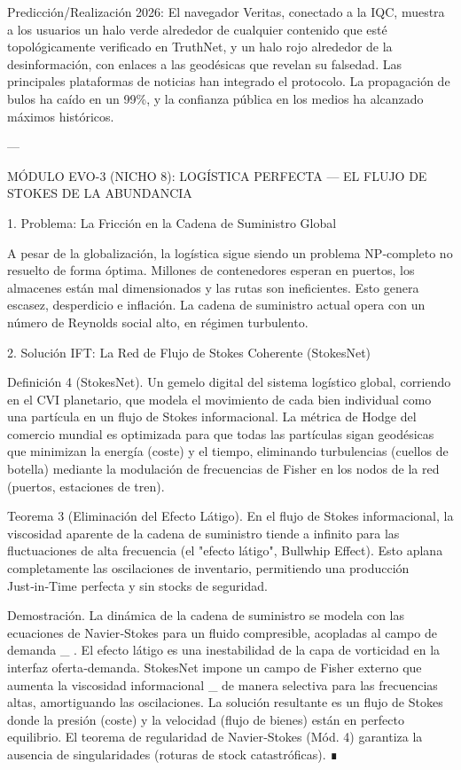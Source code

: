 \documentclass[12pt,twoside]{book}
\begin{document}
Predicción/Realización 2026: El navegador Veritas, conectado a la IQC, muestra a los usuarios un halo verde alrededor de cualquier contenido que esté topológicamente verificado en TruthNet, y un halo rojo alrededor de la desinformación, con enlaces a las geodésicas que revelan su falsedad. Las principales plataformas de noticias han integrado el protocolo. La propagación de bulos ha caído en un 99\%, y la confianza pública en los medios ha alcanzado máximos históricos.

---

MÓDULO EVO-3 (NICHO 8): LOGÍSTICA PERFECTA — EL FLUJO DE STOKES DE LA ABUNDANCIA

1. Problema: La Fricción en la Cadena de Suministro Global

A pesar de la globalización, la logística sigue siendo un problema NP‑completo no resuelto de forma óptima. Millones de contenedores esperan en puertos, los almacenes están mal dimensionados y las rutas son ineficientes. Esto genera escasez, desperdicio e inflación. La cadena de suministro actual opera con un número de Reynolds social alto, en régimen turbulento.

2. Solución IFT: La Red de Flujo de Stokes Coherente (StokesNet)

Definición 4 (StokesNet). Un gemelo digital del sistema logístico global, corriendo en el CVI planetario, que modela el movimiento de cada bien individual como una partícula en un flujo de Stokes informacional. La métrica de Hodge del comercio mundial es optimizada para que todas las partículas sigan geodésicas que minimizan la energía (coste) y el tiempo, eliminando turbulencias (cuellos de botella) mediante la modulación de frecuencias de Fisher en los nodos de la red (puertos, estaciones de tren).

Teorema 3 (Eliminación del Efecto Látigo). En el flujo de Stokes informacional, la viscosidad aparente de la cadena de suministro tiende a infinito para las fluctuaciones de alta frecuencia (el "efecto látigo", Bullwhip Effect). Esto aplana completamente las oscilaciones de inventario, permitiendo una producción Just‑in‑Time perfecta y sin stocks de seguridad.

Demostración. La dinámica de la cadena de suministro se modela con las ecuaciones de Navier‑Stokes para un fluido compresible, acopladas al campo de demanda  \rho_{} . El efecto látigo es una inestabilidad de la capa de vorticidad en la interfaz oferta‑demanda. StokesNet impone un campo de Fisher externo que aumenta la viscosidad informacional  \nu_{}  de manera selectiva para las frecuencias altas, amortiguando las oscilaciones. La solución resultante es un flujo de Stokes donde la presión (coste) y la velocidad (flujo de bienes) están en perfecto equilibrio. El teorema de regularidad de Navier‑Stokes (Mód. 4) garantiza la ausencia de singularidades (roturas de stock catastróficas). ∎
\end{document}
